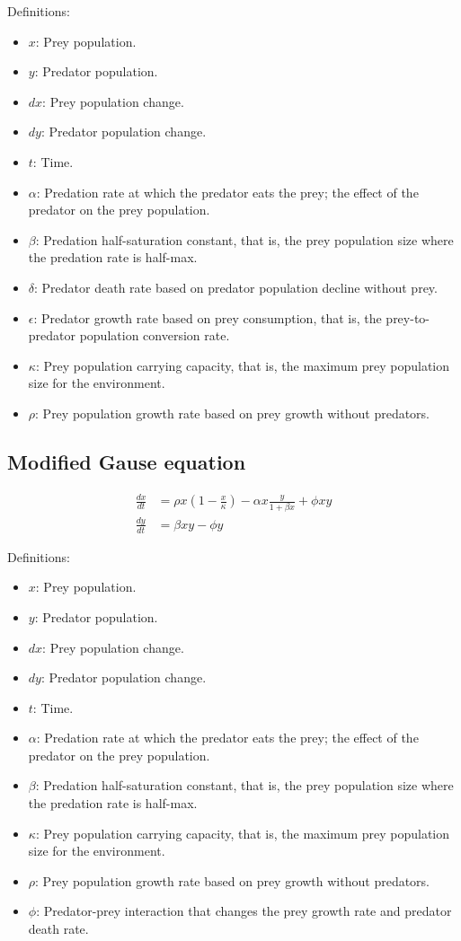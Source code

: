 Definitions:
\begin{itemize}
\item $x$: Prey population.
\item $y$: Predator population.
\item $dx$: Prey population change.
\item $dy$: Predator population change.
\item $t$: Time.
\item $\alpha$: Predation rate at which the predator eats the prey; the effect of the predator on the prey population.
\item $\beta$: Predation half-saturation constant, that is, the prey population size where the predation rate is half-max.
\item $\delta$: Predator death rate based on predator population decline without prey.
\item $\epsilon$: Predator growth rate based on prey consumption, that is, the prey-to-predator population conversion rate.
\item $\kappa$: Prey population carrying capacity, that is, the maximum prey population size for the environment.
\item $\rho$: Prey population growth rate based on prey growth without predators.
\end{itemize}

\subsection{Modified Gause equation}
\begin{align*}
\frac{dx}{dt} &= \rho x \left(1 - \frac{x}{\kappa}\right) - \alpha x \frac{y}{1 + \beta x} + \phi x y \\
\frac{dy}{dt} &= \beta x y - \phi y
\end{align*}

Definitions:
\begin{itemize}
\item $x$: Prey population.
\item $y$: Predator population.
\item $dx$: Prey population change.
\item $dy$: Predator population change.
\item $t$: Time.
\item $\alpha$: Predation rate at which the predator eats the prey; the effect of the predator on the prey population.
\item $\beta$: Predation half-saturation constant, that is, the prey population size where the predation rate is half-max.
\item $\kappa$: Prey population carrying capacity, that is, the maximum prey population size for the environment.
\item $\rho$: Prey population growth rate based on prey growth without predators.
\item $\phi$: Predator-prey interaction that changes the prey growth rate and predator death rate.
\end{itemize}

